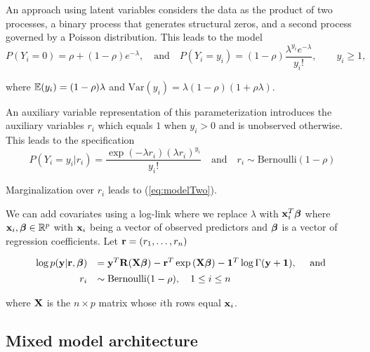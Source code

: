 \documentclass{article}[12pt]
\begin{document}

\noindent An approach using latent variables considers the data as the product of two processes, a binary process
that generates structural zeros, and a second process governed by a Poisson distribution. This leads to the model
\begin{equation}\label{eq:modelTwo}
	P(Y_i = 0) = \rho + (1 - \rho) e^{-\lambda}, 
	\quad \mbox{and} \quad 
	P(Y_i = y_i) = (1 - \rho) \frac{\lambda^{y_i} e^{-\lambda}} {y_i!},\qquad y_i \ge 1,
\end{equation}

\noindent where ${\mathbb E}(y_i) = (1 - \rho)\lambda$ 
and $\mbox{Var}(y_i) =  \lambda(1 - \rho)(1 + \rho\lambda)$.

\noindent An auxiliary variable representation of this parameterization introduces the auxiliary
variables $r_i$ which equals $1$ when $y_i>0$ and is unobserved otherwise. This leads to the
specification 
$$
P(Y_i=y_i|r_i) = \frac{\exp(-\lambda r_i)(\lambda r_i)^{y_i}}{y_i!} \quad \mbox{and} \quad r_i \sim \mbox{Bernoulli}(1-\rho)
$$

\noindent Marginalization over $r_i$ leads to (\ref{eq:modelTwo}).

\noindent We can add covariates using a log-link where we replace $\lambda$ with ${\bf x}_i^T{\boldsymbol \beta}$ where
${\bf x}_i,{\boldsymbol \beta}\in{\mathbb R}^p$ with ${\bf x}_i$ being a vector of observed predictors and ${\boldsymbol \beta}$ is 
a vector of regression coefficients. Let ${\bf r} = (r_1,\ldots,r_n)$
 
\begin{equation}\label{eq:main}
	\begin{array}{rl}
		\log p({\bf y}|{\bf r}, {\boldsymbol \beta}) 
		    & = {\bf y}^T {\bf R} ({\bf X}{\boldsymbol \beta})                              
		- {\bf r}^T \exp{({\bf X}{\boldsymbol\beta})} 
		- {\bf 1}^T \log{\Gamma{({\bf y}+ {\bf1})}}, \quad \mbox{ and }\\ [1ex]
		r_i & \sim \text{Bernoulli}(1-\rho), \quad 1 \leq i \leq n \\
	\end{array}
\end{equation} 

\noindent where ${\bf X}$ is the $n\times p$ matrix whose $i$th rows equal ${\bf x}_i$.


\subsection{Mixed model architecture}
\end{document}
